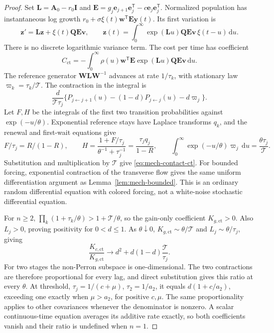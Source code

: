 \begin{proof}
Set \(\mathbf L=\mathbf A_0-r_0\mathbf I\) and \(\mathbf E=g_j\mathbf e_{j+1}\mathbf e_j^{\mathsf T}-c\mathbf e_j\mathbf e_j^{\mathsf T}\). Normalized population has instantaneous log growth \(r_0+\sigma\xi(t)\mathbf w^{\mathsf T}\mathbf E\mathbf y(t)\). Its first variation is
\[
 \mathbf z'=\mathbf L\mathbf z+\xi(t)\mathbf Q\mathbf E\mathbf v,
 \qquad \mathbf z(t)=\int_0^\infty\exp(\mathbf L u)\mathbf Q\mathbf E\mathbf v\,\xi(t-u)\,\mathrm du.
\]
There is no discrete logarithmic variance term. The cost per time has coefficient
\[
 C_{\mathrm{ct}}=-\int_0^\infty\rho(u)\mathbf w^{\mathsf T}\mathbf E
 \exp(\mathbf L u)\mathbf Q\mathbf E\mathbf v\,\mathrm du.
\]
The reference generator \(\mathbf W\mathbf L\mathbf W^{-1}\) advances at rate \(1/\tau_k\), with stationary law \(\varpi_k=\tau_k/\mathcal T\). The contraction in the integral is
\[
 \frac d{\mathcal T\tau_j}
 \{P_{j\leftarrow j+1}(u)-(1-d)P_{j\leftarrow j}(u)-d\varpi_j\}.
\]
Let \(F,H\) be the integrals of the first two transition probabilities against \(\exp(-u/\theta)\). Exponential reference stays have Laplace transforms \(q_k\), and the renewal and first-wait equations give
\[
 F/\tau_j=R/(1-R),\qquad
 H=\frac{1+F/\tau_j}{\theta^{-1}+\tau_j^{-1}}=
 \frac{\tau_jq_j}{1-R},\qquad
 \int_0^\infty\exp(-u/\theta)\varpi_j\,\mathrm du=\frac{\theta\tau_j}{\mathcal T}.
\]
Substitution and multiplication by \(\mathcal T\) give \eqref{eq:mech-contact-ct}. For bounded forcing, exponential contraction of the transverse flow gives the same uniform differentiation argument as Lemma~\ref{lem:mech-bounded}. This is an ordinary random differential equation with colored forcing, not a white-noise stochastic differential equation.

For \(n\geq2\), \(\prod_k(1+\tau_k/\theta)>1+\mathcal T/\theta\), so the gain-only coefficient \(K_{g,\mathrm{ct}}>0\). Also \(L_j>0\), proving positivity for \(0<d\leq1\). As \(\theta\downarrow0\), \(K_{g,\mathrm{ct}}\sim\theta/\mathcal T\) and \(L_j\sim\theta/\tau_j\), giving
\[
 \frac{K_{c,\mathrm{ct}}}{K_{g,\mathrm{ct}}}\longrightarrow
 d^2+d(1-d)\frac{\mathcal T}{\tau_j}.
\]
For two stages the non-Perron subspace is one-dimensional. The two contractions are therefore proportional for every lag, and direct substitution gives this ratio at every \(\theta\). At threshold, \(\tau_j=1/(c+\mu)\), \(\tau_2=1/a_2\), it equals \(d(1+c/a_2)\), exceeding one exactly when \(\mu>a_2\), for positive \(c,\mu\). The same proportionality applies to other covariances whenever the denominator is nonzero. A scalar continuous-time equation averages its additive rate exactly, so both coefficients vanish and their ratio is undefined when \(n=1\).
\end{proof}


